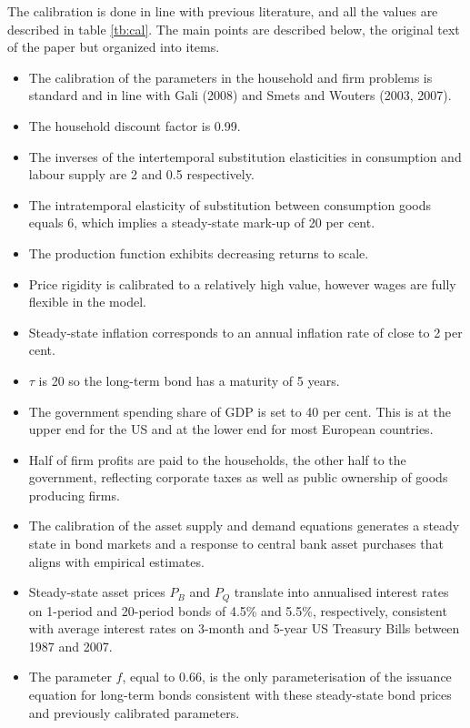 \documentclass[12pt]{article}
\begin{document}
The calibration is done in line with previous literature, and all the values are described in table \ref{tb:cal}. The main points are described below, the original text of the paper but organized into items.

\begin{itemize}
    \item The calibration of the parameters in the household and firm problems is standard and in line with Gali (2008) and Smets and Wouters (2003, 2007). %
    \item The household discount factor is 0.99.
    \item The inverses of the intertemporal substitution elasticities in consumption and labour supply are 2 and 0.5 respectively.
    \item The intratemporal elasticity of substitution between consumption goods equals 6, which implies a steady-state mark-up of 20 per cent.
    \item The production function exhibits decreasing returns to scale.
    \item Price rigidity is calibrated to a relatively high value, however wages are fully flexible in the model.
    \item Steady-state inflation corresponds to an annual inflation rate of close to 2 per cent.
    \item $\tau$ is 20 so the long-term bond has a maturity of 5 years.
    \item The government spending share of GDP is set to 40 per cent. This is at the upper end for the US and at the lower end for most European countries.
    \item Half of firm profits are paid to the households, the other half to the government, reflecting corporate taxes as well as public ownership of goods producing firms.
    \item The calibration of the asset supply and demand equations generates a steady state in bond markets and a response to central bank asset purchases that aligns with empirical estimates.
    \item Steady-state asset prices $P_B$ and $P_Q$ translate into annualised interest rates on 1-period and 20-period bonds of 4.5\% and 5.5\%, respectively, consistent with average interest rates on 3-month and 5-year US Treasury Bills between 1987 and 2007.
    \item The parameter $f$, equal to 0.66, is the only parameterisation of the issuance equation for long-term bonds consistent with these steady-state bond prices and previously calibrated parameters.

\end{itemize}
\end{document}
